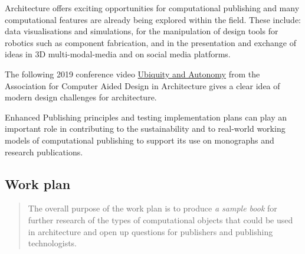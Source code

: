 \documentclass{article}
\begin{document}
Architecture offers exciting opportunities for computational publishing and many computational features are already being explored within the field. These include: data visualisations and simulations, for the manipulation of design tools for robotics such as component fabrication, and in the presentation and exchange of ideas in 3D multi-modal-media and on social media platforms.


The following 2019 conference video \href{https://www.youtube.com/watch?v=rs1rNLetobY}{Ubiquity and Autonomy} from the Association for Computer Aided Design in Architecture gives a clear idea of modern design challenges for architecture.


Enhanced Publishing principles and testing implementation plans can play an important role in contributing to the sustainability and to real-world working models of computational publishing to support its use on monographs and research publications.


\subsection{Work plan}\label{H819867}


\begin{quote}



The overall purpose of the work plan is to produce \emph{a sample book} for further research of the types of computational objects that could be used in architecture and open up questions for publishers and publishing technologists.


\end{quote}
\end{document}
